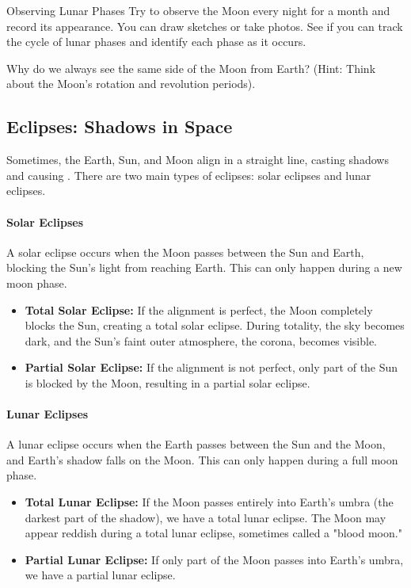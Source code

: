 \begin{example}{Observing Lunar Phases}
Try to observe the Moon every night for a month and record its appearance. You can draw sketches or take photos. See if you can track the cycle of lunar phases and identify each phase as it occurs.
\end{example}

\begin{stopandthink}
Why do we always see the same side of the Moon from Earth? (Hint: Think about the Moon's rotation and revolution periods).
\end{stopandthink}


\subsection{Eclipses: Shadows in Space}

Sometimes, the Earth, Sun, and Moon align in a straight line, casting shadows and causing . There are two main types of eclipses: solar eclipses and lunar eclipses.

\paragraph{Solar Eclipses}
A solar eclipse occurs when the Moon passes between the Sun and Earth, blocking the Sun's light from reaching Earth. This can only happen during a new moon phase.

\begin{itemize}[label=$\diamond$]
    \item \textbf{Total Solar Eclipse:} If the alignment is perfect, the Moon completely blocks the Sun, creating a total solar eclipse. During totality, the sky becomes dark, and the Sun's faint outer atmosphere, the corona, becomes visible.
    \item \textbf{Partial Solar Eclipse:} If the alignment is not perfect, only part of the Sun is blocked by the Moon, resulting in a partial solar eclipse.
\end{itemize}

\paragraph{Lunar Eclipses}
A lunar eclipse occurs when the Earth passes between the Sun and the Moon, and Earth's shadow falls on the Moon. This can only happen during a full moon phase.

\begin{itemize}[label=$\diamond$]
    \item \textbf{Total Lunar Eclipse:} If the Moon passes entirely into Earth's umbra (the darkest part of the shadow), we have a total lunar eclipse. The Moon may appear reddish during a total lunar eclipse, sometimes called a "blood moon."
    \item \textbf{Partial Lunar Eclipse:} If only part of the Moon passes into Earth's umbra, we have a partial lunar eclipse.
\end{itemize}

